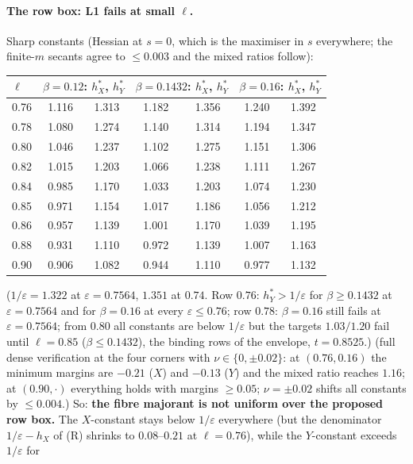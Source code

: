 \paragraph{The row box: L1 fails at small $\ell$.} Sharp constants (Hessian at $s=0$, which is the maximiser in $s$ everywhere; the finite-$m$ secants agree to $\le0.003$ and the mixed
ratios follow):
\begin{center}\footnotesize
\begin{tabular}{l|cc|cc|cc}\toprule
$\ell$ & \multicolumn{2}{c|}{$\beta=0.12$: $h_X^*$, $h_Y^*$} & \multicolumn{2}{c|}{$\beta=0.1432$: $h_X^*$, $h_Y^*$} & \multicolumn{2}{c}{$\beta=0.16$: $h_X^*$, $h_Y^*$}\\\midrule
0.76 & 1.116 & 1.313 & 1.182 & 1.356 & 1.240 & 1.392\\
0.78 & 1.080 & 1.274 & 1.140 & 1.314 & 1.194 & 1.347\\
0.80 & 1.046 & 1.237 & 1.102 & 1.275 & 1.151 & 1.306\\
0.82 & 1.015 & 1.203 & 1.066 & 1.238 & 1.111 & 1.267\\
0.84 & 0.985 & 1.170 & 1.033 & 1.203 & 1.074 & 1.230\\
0.85 & 0.971 & 1.154 & 1.017 & 1.186 & 1.056 & 1.212\\
0.86 & 0.957 & 1.139 & 1.001 & 1.170 & 1.039 & 1.195\\
0.88 & 0.931 & 1.110 & 0.972 & 1.139 & 1.007 & 1.163\\
0.90 & 0.906 & 1.082 & 0.944 & 1.110 & 0.977 & 1.132\\\bottomrule
\end{tabular}
\end{center}
($1/\varepsilon=1.322$ at $\varepsilon=0.7564$, $1.351$ at $0.74$. Row $0.76$: $h_Y^*>1/\varepsilon$ for $\beta\ge0.1432$ at $\varepsilon=0.7564$ and for $\beta=0.16$ at every $\varepsilon\le0.76$;
row $0.78$: $\beta=0.16$ still fails at $\varepsilon=0.7564$; from $0.80$ all constants are below $1/\varepsilon$ but the targets $1.03/1.20$ fail until $\ell=0.85$ ($\beta\le0.1432$), the
binding rows of the envelope, $t=0.8525$.)
(full dense verification at the four corners with $\nu\in\{0,\pm0.02\}$: at $(0.76,0.16)$ the minimum margins are $-0.21$ ($X$) and $-0.13$ ($Y$) and the mixed ratio reaches $1.16$; at
$(0.90,\cdot)$ everything holds with margins $\ge0.05$; $\nu=\pm0.02$ shifts all constants by $\le0.004$.) So: \textbf{the fibre majorant is not uniform over the proposed row box.} The
$X$-constant stays below $1/\varepsilon$ everywhere (but the denominator $1/\varepsilon-h_X$ of (R) shrinks to $0.08$--$0.21$ at $\ell=0.76$), while the $Y$-constant exceeds $1/\varepsilon$ for
